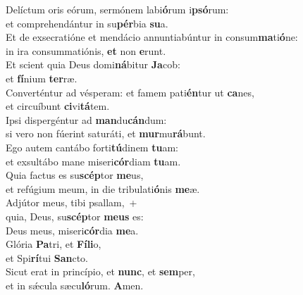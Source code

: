 \oddverse Delíctum oris eórum, sermónem labi\textbf{ó}rum i\textbf{psó}rum:~\*\\
\oddverse et comprehendántur in su\textbf{pér}bia \textbf{su}a.\\
\evenverse Et de exsecratióne et mendácio annuntiabúntur in consum\textbf{ma}ti\textbf{ó}ne:~\*\\
\evenverse in ira consummatiónis, \textbf{et} non \textbf{e}runt.\\
\oddverse Et scient quia Deus domi\textbf{ná}bitur \textbf{Ja}cob:~\*\\
\oddverse et \textbf{fí}nium \textbf{ter}ræ.\\
\evenverse Converténtur ad vésperam: et famem pati\textbf{én}tur ut \textbf{ca}nes,~\*\\
\evenverse et circuíbunt \textbf{ci}vi\textbf{tá}tem.\\
\oddverse Ipsi dispergéntur ad \textbf{man}du\textbf{cán}dum:~\*\\
\oddverse si vero non fúerint saturáti, et \textbf{mur}mu\textbf{rá}bunt.\\
\evenverse Ego autem cantábo forti\textbf{tú}dinem \textbf{tu}am:~\*\\
\evenverse et exsultábo mane miseri\textbf{cór}diam \textbf{tu}am.\\
\oddverse Quia factus es su\textbf{scép}tor \textbf{me}us,~\*\\
\oddverse et refúgium meum, in die tribulati\textbf{ó}nis \textbf{me}æ.\\
\evenverse Adjútor meus, tibi psallam,~+\\
\evenverse  quia, Deus, su\textbf{scép}tor \textbf{me}\textbf{us} es:~\*\\
\evenverse Deus meus, miseri\textbf{cór}dia \textbf{me}a.\\
\oddverse Glória \textbf{Pa}tri, et \textbf{Fí}\textbf{li}o,~\*\\
\oddverse et Spi\textbf{rí}tui \textbf{San}cto.\\
\evenverse Sicut erat in princípio, et \textbf{nunc}, et \textbf{sem}per,~\*\\
\evenverse et in sǽcula sæcu\textbf{ló}rum. \textbf{A}men.\\
